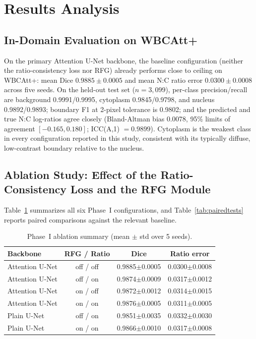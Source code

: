 \documentclass[pdflatex,sn-mathphys-num]{sn-jnl}%
\theoremstyle{thmstyleone}%
\theoremstyle{thmstyletwo}%
\theoremstyle{thmstylethree}%
\begin{document}
\section{Results Analysis}\label{sec:5}

\subsection{In-Domain Evaluation on WBCAtt+}

On the primary Attention U-Net backbone, the baseline configuration (neither the ratio-consistency loss nor RFG) already performs close to ceiling on WBCAtt+: mean Dice $0.9885\pm0.0005$ and mean N:C ratio error $0.0300\pm0.0008$ across five seeds. On the held-out test set ($n=3{,}099$), per-class precision/recall are background 0.9991/0.9995, cytoplasm 0.9845/0.9798, and nucleus 0.9892/0.9893; boundary F1 at 2-pixel tolerance is 0.9802; and the predicted and true N:C log-ratios agree closely (Bland-Altman bias 0.0078, 95\% limits of agreement $[-0.165, 0.180]$; ICC(A,1) $=0.9899$). Cytoplasm is the weakest class in every configuration reported in this study, consistent with its typically diffuse, low-contrast boundary relative to the nucleus.



\subsection{Ablation Study: Effect of the Ratio-Consistency Loss and the RFG Module}
\label{sec:ablation}

Table~\ref{tab:ablation} summarizes all six Phase~I configurations, and Table~\ref{tab:pairedtests} reports paired comparisons against the relevant baseline.

\begin{table}[t]
\caption{Phase~I ablation summary (mean $\pm$ std over 5 seeds).}
\label{tab:ablation}
\centering
\begin{tabular}{lccc}
\toprule
Backbone & RFG / Ratio & Dice & Ratio error \\
\midrule
Attention U-Net & off / off & 0.9885$\pm$0.0005 & 0.0300$\pm$0.0008 \\
Attention U-Net & off / on  & 0.9874$\pm$0.0009 & 0.0317$\pm$0.0012 \\
Attention U-Net & on / off  & 0.9872$\pm$0.0012 & 0.0314$\pm$0.0015 \\
Attention U-Net & on / on   & 0.9876$\pm$0.0005 & 0.0311$\pm$0.0005 \\
Plain U-Net     & off / on  & 0.9851$\pm$0.0035 & 0.0332$\pm$0.0030 \\
Plain U-Net     & on / on   & 0.9866$\pm$0.0010 & 0.0317$\pm$0.0008 \\
\bottomrule
\end{tabular}
\end{table}
\end{document}
